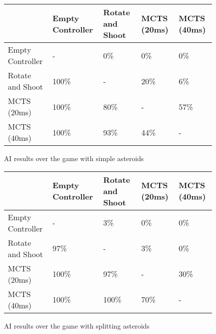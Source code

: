 \begin{figure}
	\caption{AI results over the game with simple asteroids}
	\begin{tabular}{p{7.5em} | p{4.5em} p{4.5em} p{4.5em} p{4.5em}}
		&
			Empty Controller &
			Rotate and Shoot &
			MCTS (20ms) &
			MCTS (40ms) \\ \hline
		Empty Controller &
			-&
			0\% &
			0\% &
			0\% \\
		Rotate and Shoot &
			100\% &
			-&
			20\% &
			6\% \\ 
		MCTS (20ms) &
			100\% &
			80\% &
			-&
			57\% \\
		MCTS (40ms) &
			100\% &
			93\% &
			44\% &
			-\\
	\end{tabular}
\end{figure}

\begin{figure}
	\caption{AI results over the game with splitting asteroids}
	\begin{tabular}{p{7.5em} | p{4.5em} p{4.5em} p{4.5em} p{4.5em}}
		&
			Empty Controller &
			Rotate and Shoot &
			MCTS (20ms) &
			MCTS (40ms) \\ \hline
		Empty Controller &
			-&
			3\% &
			0\% &	
			0\% \\
		Rotate and Shoot &
			97\% &
			-&
			3\% &
			0\% \\ 
		MCTS (20ms) &
			100\% &
			97\% &
			-&
			30\% \\
		MCTS (40ms) &
			100\% &
			100\% &
			70\% &
			-\\
	\end{tabular}
\end{figure}
